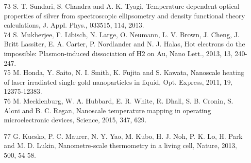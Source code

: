 \documentclass[10pt]{article}
\begin{document}
73 S. T. Sundari, S. Chandra and A. K. Tyagi, Temperature dependent optical properties of silver from spectroscopic ellipsometry and density functional theory calculations, J. Appl. Phys., 033515, 114, 2013.\\
74 S. Mukherjee, F. Libisch, N. Large, O. Neumann, L. V. Brown, J. Cheng, J. Britt Lassiter, E. A. Carter, P. Nordlander and N. J. Halas, Hot electrons do the impossible: Plasmon-induced dissociation of H2 on Au, Nano Lett., 2013, 13, 240-247.\\
75 M. Honda, Y. Saito, N. I. Smith, K. Fujita and S. Kawata, Nanoscale heating of laser irradiated single gold nanoparticles in liquid, Opt. Express, 2011, 19, 12375-12383.\\
76 M. Mecklenburg, W. A. Hubbard, E. R. White, R. Dhall, S. B. Cronin, S. Aloni and B. C. Regan, Nanoscale temperature mapping in operating microelectronic devices, Science, 2015, 347, 629.

77 G. Kucsko, P. C. Maurer, N. Y. Yao, M. Kubo, H. J. Noh, P. K. Lo, H. Park and M. D. Lukin, Nanometre-scale thermometry in a living cell, Nature, 2013, 500, 54-58.
\end{document}
